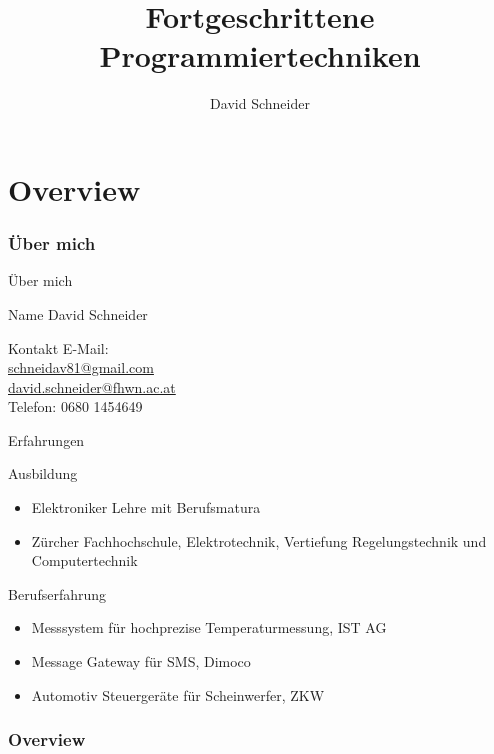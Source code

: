 \documentclass{beamer}
\title{Fortgeschrittene Programmiertechniken}
\author{David Schneider}
\begin{document}
\frame{\titlepage}

\part{Overview}

\section{Über mich}

\begin{frame}{Über mich}
\begin{block}{Name}
David Schneider
\end{block}

\begin{block}{Kontakt}
E-Mail: \\
\url{schneidav81@gmail.com} \\
\url{david.schneider@fhwn.ac.at} \\
Telefon: 0680 1454649
\end{block}

\end{frame}

\begin{frame}{Erfahrungen}

\begin{block}{Ausbildung}
\begin{itemize}
  \item Elektroniker Lehre mit Berufsmatura
  \item Zürcher Fachhochschule, Elektrotechnik, Vertiefung Regelungstechnik und
Computertechnik
\end{itemize}
\end{block}

\begin{block}{Berufserfahrung}
\begin{itemize}
  \item Messsystem für hochprezise Temperaturmessung, IST AG
  \item Message Gateway für SMS, Dimoco
  \item Automotiv Steuergeräte für Scheinwerfer, ZKW
\end{itemize}
\end{block}

\end{frame}

\section{Overview}
\end{document}

